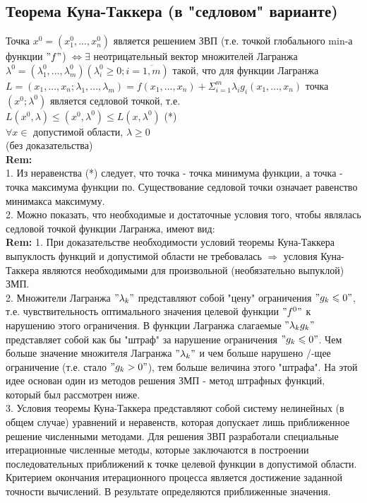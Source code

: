 \subsection{Теорема Куна-Таккера (в "седловом" варианте)}
Точка $x^0 = (x_1^0, ..., x_n^0)$ является решением ЗВП (т.е. точкой глобального min-а функции $"f"$) $\Leftrightarrow \exists$ неотрицательный вектор множителей Лагранжа \\
$\lambda^0 = (\lambda_1^0, ... , \lambda_m^0) (\lambda_i^0 \geqslant 0; i = \overline{1, m})$ такой, что для функции Лагранжа \\
$L = (x_1, ..., x_n; \lambda_1, ..., \lambda_m) = f(x_1, ... , x_n) + \Sigma_{i = 1}^m \lambda_i g_i (x_1, ... , x_n)$ точка $(x^0; \lambda^0)$ является седловой точкой, т.е. \\
$L(x^0, \lambda) \leqslant (x^0, \lambda^0) \leqslant L(x, \lambda^0)$ (*) \\
$\forall x \in$ допустимой области, $\lambda \geqslant 0$ \\
(без доказательства) \\

\textbf{Rem:} \\
1. Из неравенства (*) следует, что точка - точка минимума функции, а точка - точка максимума функции по. Существование седловой точки означает равенство минимакса максимуму. \\
2. Можно показать, что необходимые и достаточные условия того, чтобы являлась седловой точкой функции Лагранжа, имеют вид: \\

\textbf{Rem: }
1. При доказательстве необходимости условий теоремы Куна-Таккера выпуклость функций и допустимой области не требовалась $\Rightarrow$ условия Куна-Таккера являются необходимыми для произвольной (необязательно выпуклой) ЗМП. \\
2. Множители Лагранжа $"\lambda_k"$ представляют собой "цену" ограничения $"g_k \leqslant 0"$, т.е. чувствительность оптимального значения целевой функции $"f^0"$ к нарушению этого ограничения. В функции Лагранжа слагаемые $"\lambda_k g_k"$ представляет собой как бы "штраф" за нарушение ограничения $"g_k \leqslant 0"$. Чем больше значение множителя Лагранжа $"\lambda_k"$ и чем больше нарушено /-щее ограничение (т.е. стало $"g_k > 0"$), тем больше величина этого "штрафа". На этой идее основан один из методов решения ЗМП - метод штрафных функций, который был рассмотрен ниже. \\

3. Условия теоремы Куна-Таккера представляют собой систему нелинейных (в общем случае) уравнений и неравенств, которая допускает лишь приближенное решение численными методами. Для решения ЗВП разработали специальные итерационные численные методы, которые заключаются в построении последовательных приближений к точке целевой функции в допустимой области. Критерием окончания итерационного процесса является достижение заданной точности вычислений. В результате определяются приближенные значения. \\

